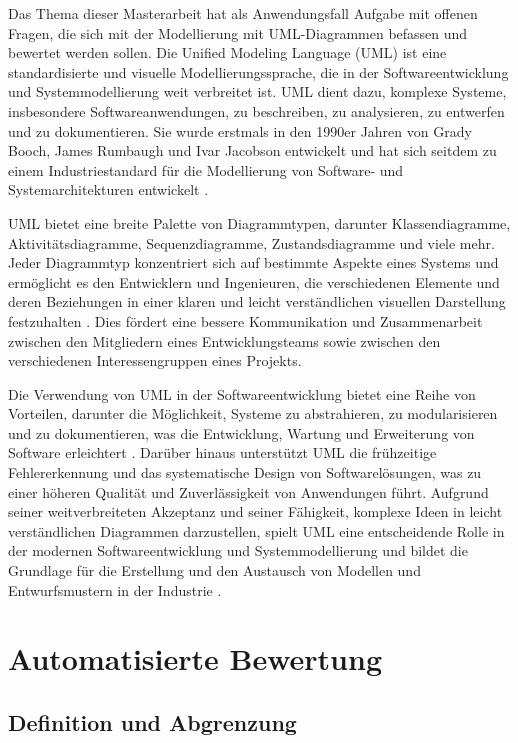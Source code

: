 Das Thema dieser Masterarbeit hat als Anwendungsfall Aufgabe mit offenen Fragen, die sich mit der Modellierung mit UML-Diagrammen befassen und bewertet werden sollen. Die Unified Modeling Language (UML) ist eine standardisierte und visuelle Modellierungssprache, die in der Softwareentwicklung und Systemmodellierung weit verbreitet ist. UML dient dazu, komplexe Systeme, insbesondere Softwareanwendungen, zu beschreiben, zu analysieren, zu entwerfen und zu dokumentieren. Sie wurde erstmals in den 1990er Jahren von Grady Booch, James Rumbaugh und Ivar Jacobson entwickelt und hat sich seitdem zu einem Industriestandard für die Modellierung von Software- und Systemarchitekturen entwickelt \cite{UML-History}.

UML bietet eine breite Palette von Diagrammtypen, darunter Klassendiagramme, Aktivitätsdiagramme, Sequenzdiagramme, Zustandsdiagramme und viele mehr. Jeder Diagrammtyp konzentriert sich auf bestimmte Aspekte eines Systems und ermöglicht es den Entwicklern und Ingenieuren, die verschiedenen Elemente und deren Beziehungen in einer klaren und leicht verständlichen visuellen Darstellung festzuhalten \cite{UML-History}. Dies fördert eine bessere Kommunikation und Zusammenarbeit zwischen den Mitgliedern eines Entwicklungsteams sowie zwischen den verschiedenen Interessengruppen eines Projekts.

Die Verwendung von UML in der Softwareentwicklung bietet eine Reihe von Vorteilen, darunter die Möglichkeit, Systeme zu abstrahieren, zu modularisieren und zu dokumentieren, was die Entwicklung, Wartung und Erweiterung von Software erleichtert \cite{UML-History}. Darüber hinaus unterstützt UML die frühzeitige Fehlererkennung und das systematische Design von Softwarelösungen, was zu einer höheren Qualität und Zuverlässigkeit von Anwendungen führt. Aufgrund seiner weitverbreiteten Akzeptanz und seiner Fähigkeit, komplexe Ideen in leicht verständlichen Diagrammen darzustellen, spielt UML eine entscheidende Rolle in der modernen Softwareentwicklung und Systemmodellierung und bildet die Grundlage für die Erstellung und den Austausch von Modellen und Entwurfsmustern in der Industrie \cite{UML-History}.



\section{Automatisierte Bewertung}

\subsection{Definition und Abgrenzung}

